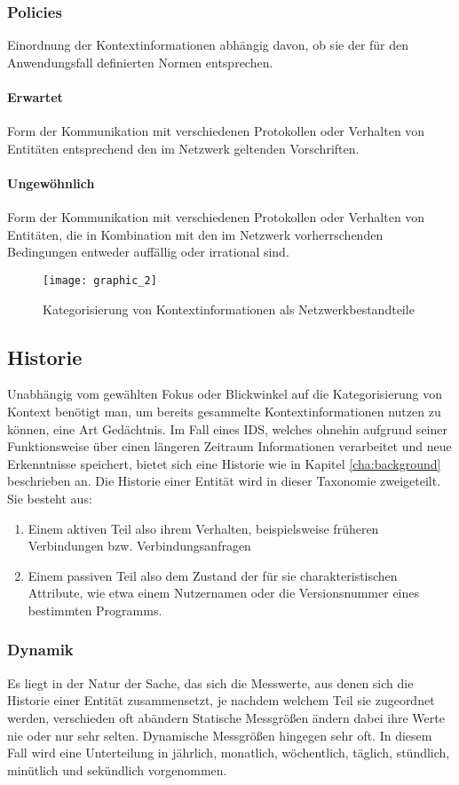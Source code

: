 \subsubsection{Policies}
Einordnung der Kontextinformationen abhängig davon, ob sie der für den Anwendungsfall definierten Normen entsprechen.
\paragraph{Erwartet}
Form der Kommunikation mit verschiedenen Protokollen oder Verhalten von Entitäten entsprechend den im Netzwerk geltenden Vorschriften.
\paragraph{Ungewöhnlich}
Form der Kommunikation mit verschiedenen Protokollen oder Verhalten von Entitäten, die in Kombination mit den im Netzwerk vorherrschenden Bedingungen entweder auffällig oder irrational sind.
\begin{figure}[H]
\centering
\texttt{[image: graphic\_2]}
\caption{Kategorisierung von Kontextinformationen als Netzwerkbestandteile}
\label{Tax_2}
\end{figure}
\subsection{Historie}
Unabhängig vom gewählten Fokus oder Blickwinkel auf die Kategorisierung von Kontext benötigt man, um bereits gesammelte Kontextinformationen nutzen zu können, eine Art Gedächtnis. Im Fall eines IDS, welches ohnehin aufgrund seiner Funktionsweise über einen längeren Zeitraum Informationen verarbeitet und neue Erkenntnisse speichert, bietet sich eine Historie wie in Kapitel \ref{cha:background} beschrieben an.
Die Historie einer Entität wird in dieser Taxonomie zweigeteilt. Sie besteht aus:
\begin{enumerate}
\item{Einem aktiven Teil also ihrem Verhalten, beispielsweise früheren Verbindungen bzw. Verbindungsanfragen}
\item{Einem passiven Teil also dem Zustand der für sie charakteristischen Attribute, wie etwa einem Nutzernamen oder die Versionsnummer eines bestimmten Programms. }
\end{enumerate}
\subsubsection{Dynamik}
Es liegt in der Natur der Sache, das sich die Messwerte, aus denen sich die Historie einer Entität zusammensetzt, je nachdem welchem Teil sie zugeordnet werden, verschieden oft abändern
Statische Messgrößen ändern dabei ihre Werte nie oder nur sehr selten. Dynamische Messgrößen hingegen sehr oft. In diesem Fall wird eine Unterteilung in jährlich, monatlich, wöchentlich, täglich, stündlich, minütlich und sekündlich vorgenommen. 

